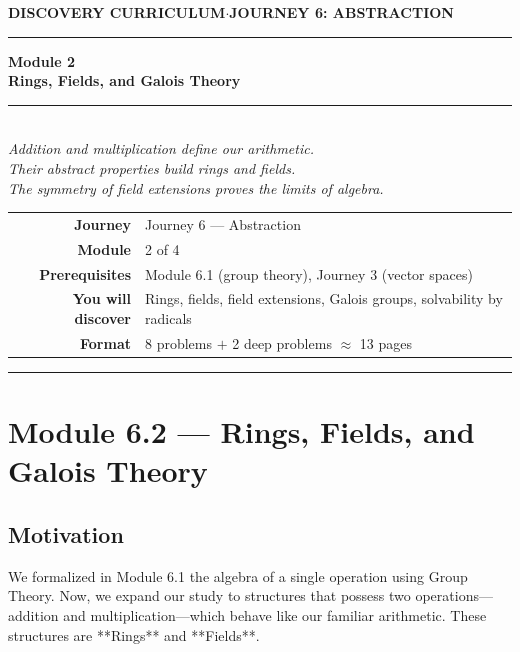 \documentclass[12pt, a4paper]{article}
\begin{document}
\thispagestyle{empty}
\begin{center}
{\small\color{ModuleColor}\textbf{DISCOVERY CURRICULUM}\quad$\cdot$\quad\textbf{JOURNEY 6: ABSTRACTION}}
\vspace{0.6cm}

{\color{NavyBlue}\rule{\linewidth}{2.5pt}}\vspace{0.5cm}

{\Huge\bfseries\color{NavyBlue}Module 2}\\[0.3cm]
{\LARGE\bfseries\color{ModuleColor}Rings, Fields, and Galois Theory}\\[0.4cm]
{\color{PuzzleColor}\rule{0.4\linewidth}{1.5pt}}\\[0.4cm]
{\large\itshape\color{NavyBlue!80}
Addition and multiplication define our arithmetic.\\[0.15cm]
Their abstract properties build rings and fields.\\[0.15cm]
The symmetry of field extensions proves the limits of algebra.}

\vspace{1.4cm}
\begin{tabular}{rl}
\textbf{Journey}         & Journey 6 --- Abstraction \\[4pt]
\textbf{Module}          & 2 of 4 \\[4pt]
\textbf{Prerequisites}   & Module 6.1 (group theory), Journey 3 (vector spaces) \\[4pt]
\textbf{You will discover} & Rings, fields, field extensions, Galois groups, solvability by radicals \\[4pt]
\textbf{Format}          & 8 problems $+$ 2 deep problems $\approx$ 13 pages \\
\end{tabular}
\vspace{1.2cm}

{\color{NavyBlue}\rule{\linewidth}{2.5pt}}
\end{center}

\newpage

\section{Module 6.2 --- Rings, Fields, and Galois Theory}
\label{sec:mod6.2}

\subsection*{Motivation}

We formalized in Module 6.1 the algebra of a single operation using Group Theory.
Now, we expand our study to structures that possess two operations—addition and multiplication—which behave like our familiar arithmetic.
These structures are **Rings** and **Fields**.
\end{document}

